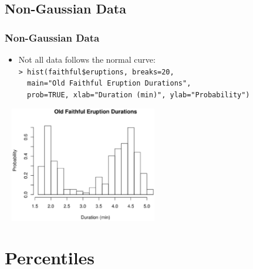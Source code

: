 \documentclass[t]{beamer}
\begin{document}
\subsection{Non-Gaussian Data}
\begin{frame}[t]\frametitle{Non-Gaussian Data}

{\small
\begin{itemize}
\item Not all data follows the normal curve:\\[5pt]
 \texttt{> hist(faithful\$eruptions, breaks=20,}\\
 \texttt{\ \ main="Old Faithful Eruption Durations",}\\
 \texttt{\ \ prob=TRUE, xlab="Duration (min)", ylab="Probability")}\vspace{-10pt}
\end{itemize}
\begin{center}
{\ }\hspace{.1in}
\hspace{.2in}
\includegraphics[height=2in]{faithful.eps}
\end{center}
}
\end{frame}


\section{Percentiles}
\end{document}
